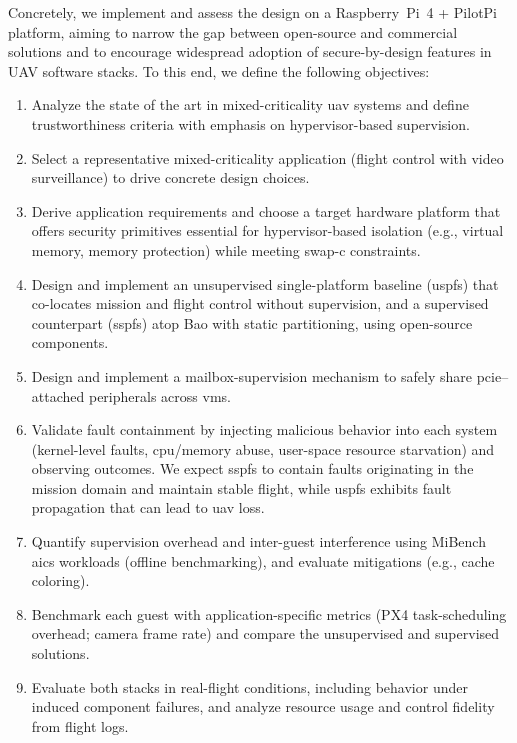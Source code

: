 Concretely, we implement and assess the design on a Raspberry~Pi~4 + PilotPi
platform, aiming to narrow the gap between open-source and commercial solutions
and to encourage widespread adoption of secure-by-design features in UAV
software stacks.
%
To this end, we define the following objectives:
\begin{enumerate}
\item Analyze the state of the art in mixed-criticality \gls{uav} systems and
      define trustworthiness criteria with emphasis on hypervisor-based supervision.
\item Select a representative mixed-criticality application (flight control with
      video surveillance) to drive concrete design choices.
\item Derive application requirements and choose a target hardware platform that
      offers security primitives essential for hypervisor-based isolation (e.g.,
      virtual memory, memory protection) while meeting \gls{swap-c} constraints.
\item Design and implement an unsupervised single-platform baseline (\gls{uspfs})
      that co-locates mission and flight control without supervision, and a
      supervised counterpart (\gls{sspfs}) atop Bao with static partitioning,
      using open-source components.
\item Design and implement a mailbox-supervision mechanism to safely share
      \gls{pcie}--attached peripherals across \glspl{vm}.
\item Validate fault containment by injecting malicious behavior into each system
      (kernel-level faults, \gls{cpu}/memory abuse, user-space resource starvation) and
      observing outcomes. We expect \gls{sspfs} to contain faults originating in
      the mission domain and maintain stable flight, while \gls{uspfs} exhibits
      fault propagation that can lead to \gls{uav} loss.
\item Quantify supervision overhead and inter-guest interference using MiBench
      \gls{aics} workloads (offline benchmarking), and evaluate mitigations
      (e.g., cache coloring).
\item Benchmark each guest with application-specific metrics (PX4 task-scheduling
      overhead; camera frame rate) and compare the unsupervised and supervised
      solutions.
\item Evaluate both stacks in real-flight conditions, including behavior under
      induced component failures, and analyze resource usage and control fidelity
      from flight logs.
\end{enumerate}

